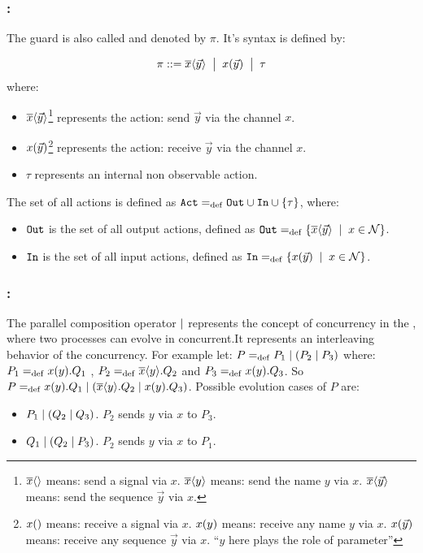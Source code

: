 \subsubsection{:} The guard is also called  and denoted by $\pi$. It's syntax is defined by:
\begin{definition}
\label{def_prefix_syntax}
\begin{align*}
 \pi ::= \overline{x}\langle\vec{y}\rangle \;\bigm|\; x(\vec{y}) \;\bigm|\; \tau
\end{align*}
where:
\begin{itemize}
\item $\overline{x}\langle\vec{y}\rangle$\footnote{$\overline{x}\langle{}\rangle$ means: send a signal via $x$. $\overline{x}\langle{y}\rangle$ means: send the name $y$ via $x$.  $\overline{x}\langle{\vec{y}}\rangle$ means: send the sequence $\vec{y}$ via $x$.} represents the action: send $\vec{y}$ via the channel $x$.
\item $x(\vec{y})$\footnote{$x({})$ means: receive a signal via $x$. $x({y})$ means: receive any name $y$ via $x$.  $x({\vec{y}})$ means: receive any sequence $\vec{y}$ via $x$. ``$y$ here plays the role of parameter''} represents the action: receive $\vec{y}$ via the channel $x$.
\item $\tau$ represents an internal non observable action.
\end{itemize}
\end{definition}
The set of all actions is defined as $\actions\define\outA\cup\inA\cup\set{\tau}$, where:
\begin{itemize}
\item $\mathtt{Out}$ is the set of all output actions, defined as $\outA\define\set[x\in\names]{\out{x}{\vec{y}}}$.
\item $\mathtt{In}$ is the set of all input actions, defined as $\inA\define\set[x\in\names]{\inp{x}{\vec{y}}}$.
\end{itemize}
\subsubsection{:}
The parallel composition operator $\mid$ represents the concept of concurrency in the \picalc{}, where two processes can evolve in concurrent.It represents an interleaving behavior of the concurrency.
For example let:  $P=_{\mathrm{def}}P_1 \mid (P_2 \mid P_3)$ where: $P_1=_{\mathrm{def}}x(y).Q_1$ , $P_2=_{\mathrm{def}}\overline{x}\langle y\rangle.Q_2$ and $P_3=_{\mathrm{def}}x(y).Q_3$. So $P=_{\mathrm{def}}x(y).Q_1 \mid (\overline{x}\langle y\rangle.Q_2 \mid x(y).Q_3)$.
Possible evolution cases of $P$ are:
\begin{itemize}
\item $P_1 \mid (Q_2 \mid Q_3)$. $P_2$ sends $y$ via $x$ to $P_3$.
\item $Q_1 \mid (Q_2 \mid P_3)$. $P_2$ sends $y$ via $x$ to $P_1$.
\end{itemize}

